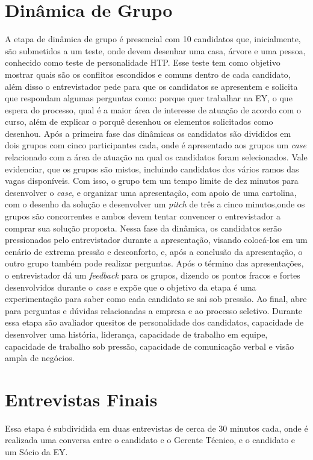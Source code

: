 \section{Dinâmica de Grupo}

A etapa de dinâmica de grupo é presencial com 10 candidatos que, inicialmente, são submetidos a um teste, onde devem desenhar uma casa, árvore e uma pessoa, conhecido como teste de personalidade HTP.
Esse teste tem como objetivo mostrar quais são os conflitos escondidos e comuns dentro de cada candidato, além disso o entrevistador pede para que os candidatos se apresentem e solicita que respondam algumas perguntas como: porque quer trabalhar na EY, o que espera do processo, qual é a maior área de interesse de atuação de acordo com o curso, além de explicar o porquê desenhou os elementos solicitados como desenhou.
Após a primeira fase das dinâmicas os candidatos são divididos em dois grupos com cinco participantes cada, onde é apresentado aos grupos um \textit{case} relacionado com a área de atuação na qual os candidatos foram selecionados. Vale evidenciar, que os grupos são mistos, incluindo candidatos dos vários ramos das vagas disponíveis.
Com isso, o grupo tem um tempo limite de dez minutos para desenvolver o \textit{case}, e organizar uma apresentação, com apoio de uma cartolina, com o desenho da solução e desenvolver um \textit{pitch} de três a cinco minutos,onde os grupos são concorrentes e ambos devem tentar convencer o entrevistador a comprar sua solução proposta. Nessa fase da dinâmica, os candidatos serão pressionados pelo entrevistador durante a apresentação, visando colocá-los em um cenário de extrema pressão e desconforto, e, após a conclusão da apresentação, o outro grupo também pode realizar perguntas.
Após o término das apresentações, o entrevistador dá um \textit{feedback} para os grupos, dizendo os pontos fracos e fortes desenvolvidos durante o \textit{case} e expõe que o objetivo da etapa é uma experimentação para saber como cada candidato se sai sob pressão.
Ao final, abre para perguntas e dúvidas relacionadas a empresa e ao processo seletivo.
Durante essa etapa são avaliador quesitos de personalidade dos candidatos, capacidade de desenvolver uma história, liderança, capacidade de trabalho em equipe, capacidade de trabalho sob pressão, capacidade de comunicação verbal e visão ampla de negócios.




\section{Entrevistas Finais}
Essa etapa é subdividida em duas entrevistas de cerca de 30 minutos cada, onde é realizada uma conversa entre o candidato e o Gerente Técnico, e o candidato e um Sócio da EY.


